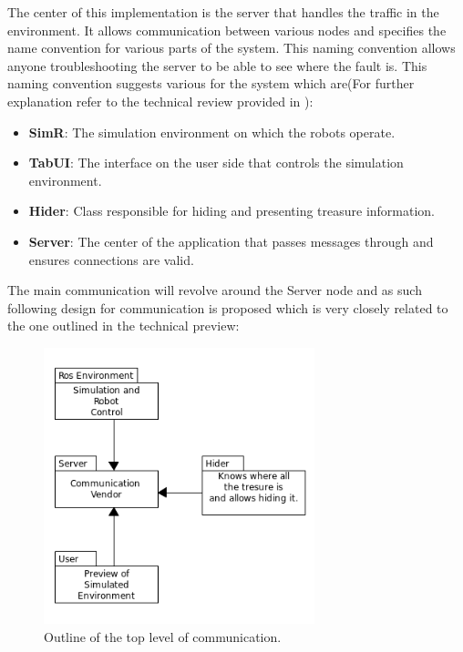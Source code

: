       The center of this implementation is the server that handles the traffic in the environment. It allows communication between various nodes and specifies the name convention for various parts of the system. This naming convention allows anyone troubleshooting the server to be able to see where the fault is. This naming convention suggests various for the system which are(For further explanation refer to the technical review provided in \cite{technical}):
        \begin{itemize}
          \item \textbf{SimR}: The simulation environment on which the robots operate.
          \item \textbf{TabUI}: The interface on the user side that controls the simulation environment.
          \item \textbf{Hider}: Class responsible for hiding and presenting treasure information.
          \item \textbf{Server}: The center of the application that passes messages through and ensures connections are valid. 
        \end{itemize}

      The main communication will revolve around the Server node and as such following design for communication is proposed which is very closely related to the one outlined in the technical preview\cite{technical}:

        \begin{figure}[!ht]  
          \centering
            \includegraphics[width=0.7\textwidth]{figures/mainCommunication.png}
            \caption{Outline of the top level of communication.}
        \end{figure}

